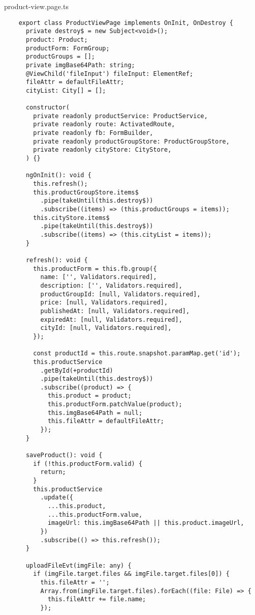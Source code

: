 product-view.page.ts
\begin{lstlisting}
    export class ProductViewPage implements OnInit, OnDestroy {
      private destroy$ = new Subject<void>();
      product: Product;
      productForm: FormGroup;
      productGroups = [];
      private imgBase64Path: string;
      @ViewChild('fileInput') fileInput: ElementRef;
      fileAttr = defaultFileAttr;
      cityList: City[] = [];
    
      constructor(
        private readonly productService: ProductService,
        private readonly route: ActivatedRoute,
        private readonly fb: FormBuilder,
        private readonly productGroupStore: ProductGroupStore,
        private readonly cityStore: CityStore,
      ) {}
    
      ngOnInit(): void {
        this.refresh();
        this.productGroupStore.items$
          .pipe(takeUntil(this.destroy$))
          .subscribe((items) => (this.productGroups = items));
        this.cityStore.items$
          .pipe(takeUntil(this.destroy$))
          .subscribe((items) => (this.cityList = items));
      }
    
      refresh(): void {
        this.productForm = this.fb.group({
          name: ['', Validators.required],
          description: ['', Validators.required],
          productGroupId: [null, Validators.required],
          price: [null, Validators.required],
          publishedAt: [null, Validators.required],
          expiredAt: [null, Validators.required],
          cityId: [null, Validators.required],
        });
    
        const productId = this.route.snapshot.paramMap.get('id');
        this.productService
          .getById(+productId)
          .pipe(takeUntil(this.destroy$))
          .subscribe((product) => {
            this.product = product;
            this.productForm.patchValue(product);
            this.imgBase64Path = null;
            this.fileAttr = defaultFileAttr;
          });
      }
    
      saveProduct(): void {
        if (!this.productForm.valid) {
          return;
        }
        this.productService
          .update({
            ...this.product,
            ...this.productForm.value,
            imageUrl: this.imgBase64Path || this.product.imageUrl,
          })
          .subscribe(() => this.refresh());
      }
    
      uploadFileEvt(imgFile: any) {
        if (imgFile.target.files && imgFile.target.files[0]) {
          this.fileAttr = '';
          Array.from(imgFile.target.files).forEach((file: File) => {
            this.fileAttr += file.name;
          });
    

\end{lstlisting}
